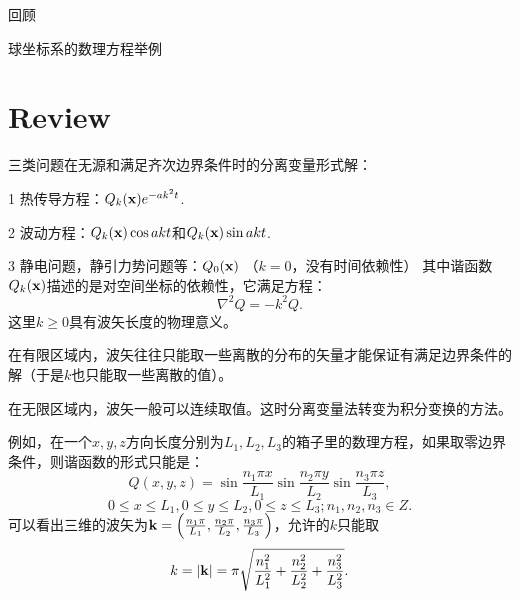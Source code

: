 \documentclass[CJK]{beamer}
\date{}
\begin{document}

\begin{frame}
\bch
\bitem
\item{回顾}
\item{球坐标系的数理方程举例}
\eitem
\ech
\end{frame}

\section{Review}

\begin{frame}
\bch
三类问题在无源和满足齐次边界条件时的分离变量形式解：
\bitem
\item[1]{热传导方程：$Q_k({\mathbf{x}})e^{-ak^2t}$.}
\item[2]{波动方程：$Q_k({\mathbf{x}})\cos{akt}$和$Q_k({\mathbf{x}})\sin{akt}$.}
\item[3]{静电问题，静引力势问题等：$Q_0({\mathbf{x}})$ （$k=0$，没有时间依赖性）}  
  \eitem
  其中谐函数$Q_k({\mathbf{x}})$描述的是对空间坐标的依赖性，它满足方程：
  $$ \nabla^2 Q = -k^2Q.$$
  这里$k\ge 0$具有波矢长度的物理意义。
\bitem
\item{在有限区域内，波矢往往只能取一些离散的分布的矢量才能保证有满足边界条件的解（于是$k$也只能取一些离散的值）。}
\item{在无限区域内，波矢一般可以连续取值。这时分离变量法转变为积分变换的方法。}
  \eitem
  \ech
\end{frame}



\begin{frame}
\bch


例如，在一个$x,y,z$方向长度分别为$L_1,L_2, L_3$的箱子里的数理方程，如果取零边界条件，则谐函数的形式只能是：
$$ Q(x,y,z) = \sin{\frac{n_1\pi x}{L_1}}\sin{\frac{n_2\pi y}{L_2}}\sin{\frac{n_3\pi z}{L_3}},  $$
$$ 0\le x\le L_1, 0\le y\le L_2, 0\le z\le L_3; n_1, n_2, n_3\in Z.$$
可以看出三维的波矢为${\mathbf{k}} = \left(\frac{n_1\pi}{L_1}, \frac{n_2\pi}{L_2}, \frac{n_3\pi}{L_3}\right)$，允许的$k$只能取
$$k=|{\mathbf{k}}|=\pi\sqrt{\frac{n_1^2}{L_1^2}+\frac{n_2^2}{L_2^2}+\frac{n_3^2}{L_3^2}}.$$
\ech
\end{frame}
\end{document}
